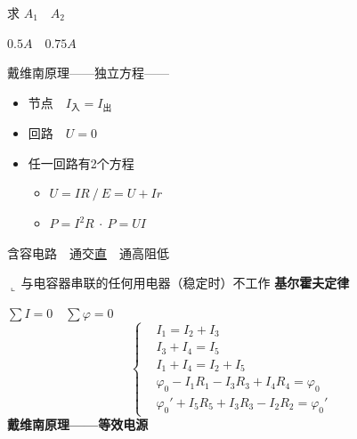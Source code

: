 \begin{problem}
\noindent 求 $A_1$　$A_2$

\noindent $0.5\unit{A}$　$0.75\unit{A}$
\end{problem}
\noindent 戴维南原理——独立方程——
\begin{itemize}
\item 节点　$I_{\text{入}}=I_{\text{出}}$
\item 回路　$U=0$
\item 任一回路有2个方程
\begin{itemize}
\item $U=IR\ /\ E=U+Ir$
\item $P=I^2R\ \cdot\ P=UI$
\end{itemize}
\end{itemize}
\noindent 含容电路　通交\underline{直}　通高阻低

\noindent \hspace*{2em}$\llcorner$\,与电容器串联的任何用电器（稳定时）不工作
\textbf{基尔霍夫定律}

\noindent $\sum I=0$　$\sum\varphi=0$
\[ \left\{\begin{aligned}
&I_1=I_2+I_3\\
&I_3+I_4=I_5\\
&I_1+I_4=I_2+I_5\\
&\varphi_0-I_1R_1-I_3R_3+I_4R_4=\varphi_0\\
&\varphi_0'+I_5R_5+I_3R_3-I_2R_2=\varphi_0'
\end{aligned}\right. \]
\textbf{戴维南原理——等效电源}

